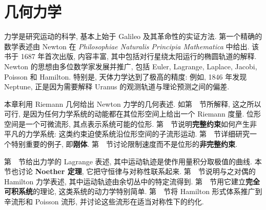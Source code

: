 \chapter{几何力学}\label{chap:geometric-mechanics}
\begingroup
\renewcommand{\thefootnote}{}
\endgroup

力学是研究运动的科学, 基本上始于 Galileo 及其革命性的实证方法. 第一个精确的数学表述由 Newton 在 \emph{Philosophiae Naturalis Principia Mathematica} 中给出. 该书于 1687 年首次出版, 内容丰富, 其中包括对行星绕太阳运行的椭圆轨道的解释. Newton 的思想由多位数学家发展并推广, 包括 Euler, Lagrange, Laplace, Jacobi, Poisson 和 Hamilton. 特别是, 天体力学达到了极高的精度: 例如, 1846 年发现 Neptune, 正是因为需要解释 Uranus 的观测轨道与理论预测之间的偏差.

本章利用 Riemann 几何给出 Newton 力学的几何表述. 如第~~节所解释, 这之所以可行, 是因为任何力学系统的动能都在其位形空间上给出一个 Riemann 度量. 位形空间是一个可微流形, 其点表示系统可能的位形. 第~~节说明\textbf{完整约束}如何产生非平凡的力学系统: 这类约束迫使系统沿位形空间的子流形运动. 第~~节详细研究一个特别重要的例子, 即\textbf{刚体}. 第~~节讨论限制速度而不是位形的\textbf{非完整约束}.

第~~节给出力学的 Lagrange 表述, 其中运动轨迹是使作用量积分取极值的曲线. 本节也讨论 \textbf{Noether 定理}, 它把守恒律与对称性联系起来. 第~~节说明与之对偶的 Hamilton 力学表述, 其中运动轨迹由余切丛中的特定流得到. 第~~节用它建立\textbf{完全可积系统}的理论, 这类系统的动力学特别简单. 第~~节将 Hamilton 形式体系推广到辛流形和 Poisson 流形, 并讨论这些流形在适当对称性下的约化.
